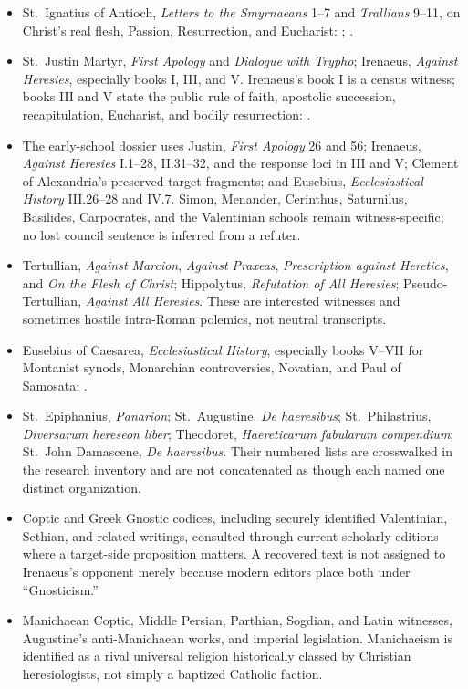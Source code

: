 \begin{itemize}
  \item St.~Ignatius of Antioch, \emph{Letters to the Smyrnaeans} 1--7 and \emph{Trallians} 9--11, on Christ's real flesh, Passion, Resurrection, and Eucharist: ; .
  \item St.~Justin Martyr, \emph{First Apology} and \emph{Dialogue with Trypho}; Irenaeus, \emph{Against Heresies}, especially books I, III, and V. Irenaeus's book I is a census witness; books III and V state the public rule of faith, apostolic succession, recapitulation, Eucharist, and bodily resurrection: .
  \item The early-school dossier uses Justin, \emph{First Apology} 26 and 56; Irenaeus, \emph{Against Heresies} I.1--28, II.31--32, and the response loci in III and V; Clement of Alexandria's preserved target fragments; and Eusebius, \emph{Ecclesiastical History} III.26--28 and IV.7. Simon, Menander, Cerinthus, Saturnilus, Basilides, Carpocrates, and the Valentinian schools remain witness-specific; no lost council sentence is inferred from a refuter.
  \item Tertullian, \emph{Against Marcion}, \emph{Against Praxeas}, \emph{Prescription against Heretics}, and \emph{On the Flesh of Christ}; Hippolytus, \emph{Refutation of All Heresies}; Pseudo-Tertullian, \emph{Against All Heresies}. These are interested witnesses and sometimes hostile intra-Roman polemics, not neutral transcripts.
  \item Eusebius of Caesarea, \emph{Ecclesiastical History}, especially books V--VII for Montanist synods, Monarchian controversies, Novatian, and Paul of Samosata: .
  \item St.~Epiphanius, \emph{Panarion}; St.~Augustine, \emph{De haeresibus}; St.~Philastrius, \emph{Diversarum hereseon liber}; Theodoret, \emph{Haereticarum fabularum compendium}; St.~John Damascene, \emph{De haeresibus}. Their numbered lists are crosswalked in the research inventory and are not concatenated as though each named one distinct organization.
  \item Coptic and Greek Gnostic codices, including securely identified Valentinian, Sethian, and related writings, consulted through current scholarly editions where a target-side proposition matters. A recovered text is not assigned to Irenaeus's opponent merely because modern editors place both under ``Gnosticism.''
  \item Manichaean Coptic, Middle Persian, Parthian, Sogdian, and Latin witnesses, Augustine's anti-Manichaean works, and imperial legislation. Manichaeism is identified as a rival universal religion historically classed by Christian heresiologists, not simply a baptized Catholic faction.
\end{itemize}

